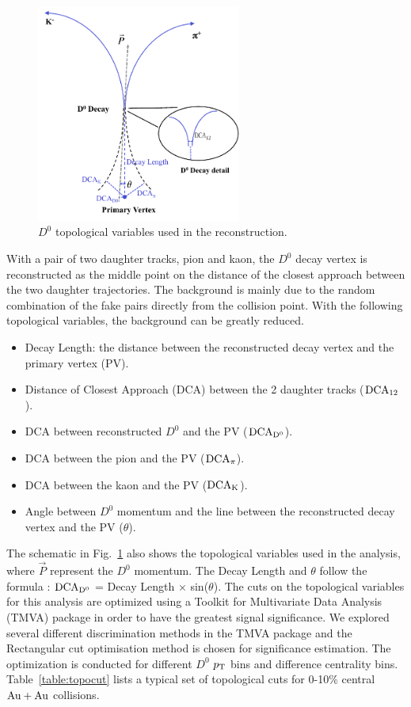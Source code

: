 \documentclass[%
 reprint,	
 amsmath,amssymb,
 aps,
 prc,
]{revtex4-1}
\begin{document}
\begin{figure}
\centering
\includegraphics[width=0.6\textwidth]{fig/D0carton.pdf}
\caption{$D^{0}$ topological variables used in the reconstruction.}
\label{fig:D0carton} 
\end{figure}

With a pair of two daughter tracks, pion and kaon, the $D^0$ decay vertex is reconstructed as the middle point on the distance of the closest approach between the two daughter trajectories. The background is mainly due to the random combination of the fake pairs directly from the collision point. With the following topological variables, the background can be greatly reduced.

\begin{itemize}
  \item Decay Length: the distance between the reconstructed decay vertex and the primary vertex (PV).
  \item Distance of Closest Approach (DCA) between the 2 daughter tracks ($\rm DCA_{12}$).
  \item DCA between reconstructed $D^0$ and the PV ($\rm DCA_{D^{0}}$).
  \item DCA between the pion and the PV ($\rm DCA_{\pi}$).
  \item DCA between the kaon and the PV ($\rm DCA_{K}$).
  \item Angle between $D^0$ momentum and the line between the reconstructed decay vertex and the PV ($\theta$).
\end{itemize}

The schematic in Fig.~\ref{fig:D0carton} also shows the topological variables used in the analysis, where $\vec{P}$ represent the $D^0$ momentum. The Decay Length and $\theta$ follow the formula : $\rm DCA_{D^{0}}$ = Decay Length $\times$ sin($\theta$). The cuts on the topological variables for this analysis are optimized using a Toolkit for Multivariate Data Analysis (TMVA) package in order to have the greatest signal significance. We explored several different discrimination methods in the TMVA package and the Rectangular cut optimisation method is chosen for significance estimation. The optimization is conducted for different $D^0$ $p_{\rm T}$ bins and difference centrality bins. Table~\ref{table:topocut} lists a typical set of topological cuts for 0-10\% central ${\rm{Au + Au}}$ collisions.
\end{document}
